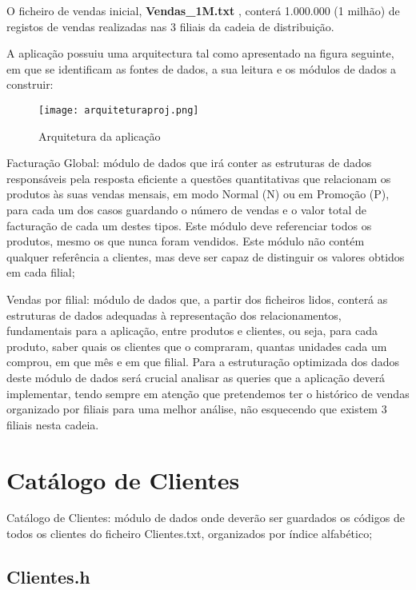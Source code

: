  
O ficheiro de vendas inicial, \textbf{Vendas\_1M.txt} , conterá 1.000.000 (1 milhão) de registos de vendas realizadas nas 3 filiais da cadeia de distribuição. 
 

A aplicação possuiu uma arquitectura tal como apresentado na figura seguinte, em que se identificam as fontes de dados, a sua leitura e os módulos de dados a construir: 



\begin{figure}  
	\texttt{[image: arquiteturaproj.png]}  
	\caption{Arquitetura da aplicação}  
\end{figure}

Facturação Global: módulo de dados que irá conter as estruturas de dados
responsáveis pela resposta eficiente a questões quantitativas que relacionam
os produtos às suas vendas mensais, em modo Normal (N) ou em Promoção
(P), para cada um dos casos guardando o número de vendas e o valor total de
facturação de cada um destes tipos. Este módulo deve referenciar todos os
produtos, mesmo os que nunca foram vendidos.
Este módulo não contém qualquer referência a clientes, mas deve ser capaz de
distinguir os valores obtidos em cada filial; 



Vendas por filial: módulo de dados que, a partir dos ficheiros lidos, conterá as
estruturas de dados adequadas à representação dos relacionamentos,
fundamentais para a aplicação, entre produtos e clientes, ou seja, para cada
produto, saber quais os clientes que o compraram, quantas unidades cada um
comprou, em que mês e em que filial.
Para a estruturação optimizada dos dados deste módulo de dados será crucial
analisar as queries que a aplicação deverá implementar, tendo sempre em
atenção que pretendemos ter o histórico de vendas organizado por filiais para
uma melhor análise, não esquecendo que existem 3 filiais nesta cadeia. 





\chapter{Catálogo de Clientes}
Catálogo de Clientes: módulo de dados onde deverão ser guardados os códigos de todos os clientes do ficheiro Clientes.txt, organizados por índice alfabético; 

\section{Clientes.h}

